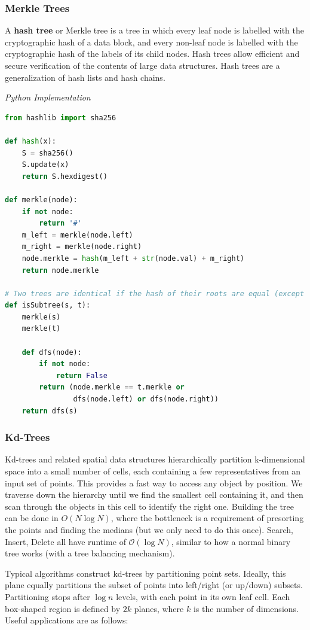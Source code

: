 \documentclass{article}
\newcommand{\bigO}{\mathcal{O}}
\begin{document}
    \subsubsection{Merkle Trees}
    A \textbf{hash tree} or Merkle tree is a tree in which every leaf node is labelled with the cryptographic hash of a data block, and every non-leaf node is labelled with the cryptographic hash of the labels of its child nodes. Hash trees allow efficient and secure verification of the contents of large data structures. Hash trees are a generalization of hash lists and hash chains.
    
\vspace{8pt} \emph{Python Implementation}
\begin{lstlisting}[language=Python]
from hashlib import sha256

def hash(x):
    S = sha256()
    S.update(x)
    return S.hexdigest()

def merkle(node):
    if not node:
        return '#'
    m_left = merkle(node.left)
    m_right = merkle(node.right)
    node.merkle = hash(m_left + str(node.val) + m_right)
    return node.merkle

# Two trees are identical if the hash of their roots are equal (except for collisions)
def isSubtree(s, t):
    merkle(s)
    merkle(t)
    
    def dfs(node):
        if not node:
            return False
        return (node.merkle == t.merkle or
                dfs(node.left) or dfs(node.right))
    return dfs(s)
\end{lstlisting}

\subsubsection{Kd-Trees}
    Kd-trees and related spatial data structures hierarchically partition k-dimensional space into a small number of cells, each containing a few representatives from an input set of points. This provides a fast way to access any object by position. We traverse down the hierarchy until we find the smallest cell containing it, and then scan through the objects in this cell to identify the right one. Building the tree can be done in $O(N \log N)$, where the bottleneck is a requirement of presorting the points and finding the medians (but we only need to do this once). Search, Insert, Delete all have runtime of $\bigO(\log N)$, similar to how a normal binary tree works (with a tree balancing mechanism).
    
    Typical algorithms construct kd-trees by partitioning point sets. Ideally, this plane equally partitions the subset of points into left/right (or up/down) subsets. Partitioning stops after $\log n$ levels, with each point in its own leaf cell. Each box-shaped region is defined by $2k$ planes, where $k$ is the number of dimensions. Useful applications are as follows:
    
\end{document}
